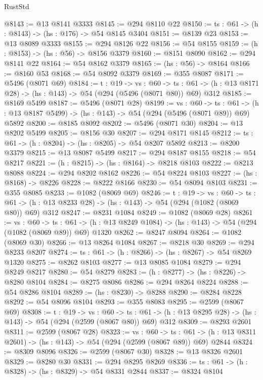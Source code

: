 \begin{lexlean}{RustStd}
\begin{coremodule}
@8143 := @13 @8141 @3333
@8145 := @294 @8110 @22
@8150 := {ts : @61} -> (h : @8143) -> (hs : @176) -> @54 @8145 @3404
@8151 := @8139 @23
@8153 := @13 @8089 @3333
@8155 := @294 @8126 @22
@8156 := @54 @8155
@8159 := (h : @8153) -> (hs : @56) -> @8156 @3379
@8160 := @8151 @8090
@8162 := @294 @8141 @22
@8164 := @54 @8162 @3379
@8165 := (hs : @56) -> @8164
@8166 := @8160 @53
@8168 := @54 @8092 @3379
@8169 := @355 @8087
@8171 := @5496 (@8071 @69)
@8184 := {t : @19} ->
  {vs : @60} ->
  {ts : @61} -> (h : @13 @8171 @28) -> (hs : @143) -> @54 (@294 (@5496 (@8071 @80)) @69) @312
@8185 := @8169 @5499
@8187 := @5496 (@8071 @28)
@8199 := {vs : @60} ->
  {ts : @61} -> (h : @13 @8187 @5499) -> (hs : @143) -> @54 (@294 (@5496 (@8071 @89)) @69) @5892
@8200 := @8185 @8092
@8202 := @5496 (@8071 @30)
@8204 := @13 @8202 @5499
@8205 := @8156 @30
@8207 := @294 @8171 @8145
@8212 := {ts : @61} -> (h : @8204) -> (hs : @8205) -> @54 @8207 @5892
@8213 := @8200 @3379
@8215 := @13 @8087 @5499
@8217 := @294 @8187 @8155
@8218 := @54 @8217
@8221 := (h : @8215) -> (hs : @8164) -> @8218 @8103
@8222 := @8213 @8088
@8224 := @294 @8202 @8162
@8226 := @54 @8224 @8103
@8227 := (hs : @8168) -> @8226
@8228 := @8222 @8166
@8230 := @54 @8094 @8103
@8231 := @355 @8085
@8233 := @1082 (@8069 @69)
@8246 := {t : @19} ->
  {vs : @60} ->
  {ts : @61} -> (h : @13 @8233 @28) -> (hs : @143) -> @54 (@294 (@1082 (@8069 @80)) @69) @312
@8247 := @8231 @1084
@8249 := @1082 (@8069 @28)
@8261 := {vs : @60} ->
  {ts : @61} -> (h : @13 @8249 @1084) -> (hs : @143) -> @54 (@294 (@1082 (@8069 @89)) @69) @1320
@8262 := @8247 @8094
@8264 := @1082 (@8069 @30)
@8266 := @13 @8264 @1084
@8267 := @8218 @30
@8269 := @294 @8233 @8207
@8274 := {ts : @61} -> (h : @8266) -> (hs : @8267) -> @54 @8269 @1320
@8275 := @8262 @8103
@8277 := @13 @8085 @1084
@8279 := @294 @8249 @8217
@8280 := @54 @8279
@8283 := (h : @8277) -> (hs : @8226) -> @8280 @8104
@8284 := @8275 @8086
@8286 := @294 @8264 @8224
@8288 := @54 @8286 @8104
@8289 := (hs : @8230) -> @8288
@8290 := @8284 @8228
@8292 := @54 @8096 @8104
@8293 := @355 @8083
@8295 := @2599 (@8067 @69)
@8308 := {t : @19} ->
  {vs : @60} ->
  {ts : @61} -> (h : @13 @8295 @28) -> (hs : @143) -> @54 (@294 (@2599 (@8067 @80)) @69) @312
@8309 := @8293 @2601
@8311 := @2599 (@8067 @28)
@8323 := {vs : @60} ->
  {ts : @61} -> (h : @13 @8311 @2601) -> (hs : @143) -> @54 (@294 (@2599 (@8067 @89)) @69) @2844
@8324 := @8309 @8096
@8326 := @2599 (@8067 @30)
@8328 := @13 @8326 @2601
@8329 := @8280 @30
@8331 := @294 @8295 @8269
@8336 := {ts : @61} -> (h : @8328) -> (hs : @8329) -> @54 @8331 @2844
@8337 := @8324 @8104

\end{coremodule}
\end{lexlean}
